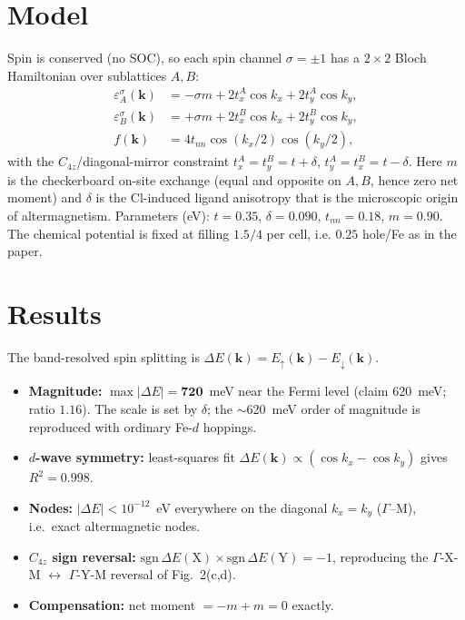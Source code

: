 \documentclass[aps,prb,twocolumn,superscriptaddress,floatfix]{revtex4-2}
\begin{document}
\section{Model}
Spin is conserved (no SOC), so each spin channel $\sigma=\pm1$ has a $2\times2$
Bloch Hamiltonian over sublattices $A,B$:
\begin{align}
\varepsilon_A^\sigma(\bm k) &= -\sigma m + 2t_x^A\cos k_x + 2t_y^A\cos k_y,\\
\varepsilon_B^\sigma(\bm k) &= +\sigma m + 2t_x^B\cos k_x + 2t_y^B\cos k_y,\\
f(\bm k) &= 4t_{nn}\cos(k_x/2)\cos(k_y/2),
\end{align}
with the $C_{4z}$/diagonal-mirror constraint $t_x^A=t_y^B=t+\delta$,
$t_y^A=t_x^B=t-\delta$. Here $m$ is the checkerboard on-site exchange (equal and
opposite on $A,B$, hence zero net moment) and $\delta$ is the Cl-induced ligand
anisotropy that is the microscopic origin of altermagnetism. Parameters (eV):
$t=0.35$, $\delta=0.090$, $t_{nn}=0.18$, $m=0.90$. The chemical potential is
fixed at filling $1.5/4$ per cell, i.e. $0.25$ hole/Fe as in the paper.

\section{Results}
The band-resolved spin splitting is
$\Delta E(\bm k)=E_\uparrow(\bm k)-E_\downarrow(\bm k)$.
\begin{itemize}
\item \textbf{Magnitude:} $\max|\Delta E|=\mathbf{720}$~meV near the Fermi
level (claim 620~meV; ratio $1.16$). The scale is set by $\delta$; the
$\sim$620~meV order of magnitude is reproduced with ordinary Fe-$d$ hoppings.
\item \textbf{$d$-wave symmetry:} least-squares fit
$\Delta E(\bm k)\propto(\cos k_x-\cos k_y)$ gives $R^2=0.998$.
\item \textbf{Nodes:} $|\Delta E|<10^{-12}$~eV everywhere on the diagonal
$k_x=k_y$ ($\Gamma$--M), i.e.\ exact altermagnetic nodes.
\item \textbf{$C_{4z}$ sign reversal:} $\mathrm{sgn}\,\Delta E(\mathrm X)\times
\mathrm{sgn}\,\Delta E(\mathrm Y)=-1$, reproducing the $\Gamma$-X-M
$\leftrightarrow$ $\Gamma$-Y-M reversal of Fig.~2(c,d).
\item \textbf{Compensation:} net moment $=-m+m=0$ exactly.
\end{itemize}
\end{document}
